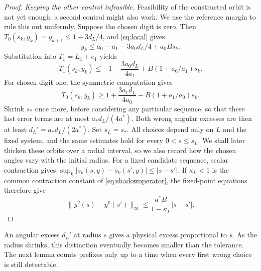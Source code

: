 \documentclass[11pt]{amsart}
\theoremstyle{definition}
\theoremstyle{remark}
\numberwithin{equation}{section}
\begin{document}
\begin{proof}
\smallskip
\emph{Keeping the other control infeasible.}
Feasibility of the constructed orbit is not yet enough: a second
control might also work. We use the reference margin to rule this
out uniformly. Suppose the chosen digit is zero.
Then \(T_0(s_k,y_k)=y_{k+1}\le1-3d_L/4\), and \eqref{eq:local} gives
\[
 y_k\le a_0-a_1-3a_0d_L/4+a_0Bs_k.
\]
Substitution into \(T_1=L_1+e_1\) yields
\[
 T_1(s_k,y_k)\le-1-\frac{3a_0d_L}{4a_1}
                           +B(1+a_0/a_1)s_k.
\]
For chosen digit one, the symmetric computation gives
\[
 T_0(s_k,y_k)\ge1+\frac{3a_1d_L}{4a_0}
                           -B(1+a_1/a_0)s_k.
\]
Shrink \(s_*\) once more, before considering any particular sequence,
so that these last error terms are at most
\(a_*d_L/(4a^*)\). Both wrong angular excesses are then at least
\(d_L'=a_*d_L/(2a^*)\). Set \(s_L=s_*\).
All choices depend only on $L$ and the fixed system, and the same
estimates hold for every $0<s\le s_L$. We shall later thicken
these orbits over a radial interval, so we also record how the
chosen angles vary with the initial radius.
For a fixed candidate sequence, scalar contraction gives
$\sup_k|s_k(s,y)-s_k(s',y)|\le|s-s'|$.
If $\kappa_L<1$ is the common contraction constant of
\eqref{eq:shadowoperator}, the fixed-point equations therefore give
\begin{equation}\label{eq:shadowcontinuous}
\|y^v(s)-y^v(s')\|_\infty
 \le\frac{a^*B}{1-\kappa_L}|s-s'|.
\end{equation}
\end{proof}

An angular excess $d_L'$ at radius $s$ gives a physical excess
proportional to $s$. As the radius shrinks, this distinction
eventually becomes smaller than the tolerance. The next lemma
counts prefixes only up to a time when every first wrong choice
is still detectable.
\end{document}
